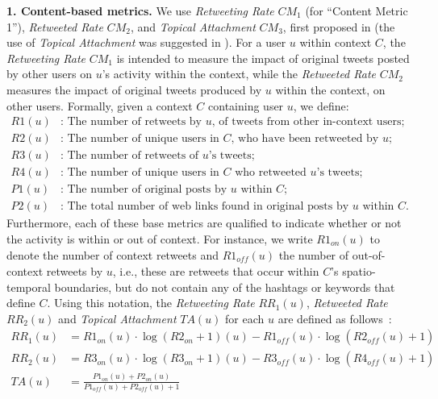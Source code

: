 \documentclass[runningheads]{llncs}
\begin{document}
\noindent \textbf{1. Content-based metrics.}  We use \textit{Retweeting Rate} $\mathit{CM}_1$ (for ``Content Metric 1''), \textit{Retweeted Rate} $\mathit{CM}_2$, and \textit{Topical Attachment} $\mathit{CM}_3$, first proposed in \cite{Bizid:2015} (the use of \textit{Topical Attachment} was suggested in \cite{Poell2014}).
%
For a user $u$ within context $C$, the \textit{Retweeting Rate} $\mathit{CM}_1$ is intended to measure the impact of original tweets posted by other users on $u$'s activity within the context, while the \textit{Retweeted Rate} $\mathit{CM}_2$ measures the impact of original tweets produced by $u$ within the context, on other users.
Formally, given a context $C$ containing user $u$, we define:
%
\begin{align*}
\mathit{R1}(u) &\text{: The number of retweets by $u$, of tweets from other in-context users;}\\
\mathit{R2}(u)&\text{: The number of unique users in $C$, who have been retweeted by $u$;}\\
\mathit{R3}(u)&\text{: The number of retweets of $u$'s tweets;}\\
\mathit{R4}(u)&\text{: The number of unique users in $C$ who retweeted $u$'s tweets;}\\
\mathit{P1}(u)&\text{: The number of original posts by $u$ within $C$;}\\
\mathit{P2}(u)&\text{: The total number of web links found in original posts by $u$ within $C$.}
\end{align*}
%
Furthermore, each of these base metrics are qualified to indicate whether or not the activity is within or out of context.
For instance, we write $R1_{on}(u)$ to denote the number of context retweets and $R1_{\mathit{off}}(u)$ the number of out-of-context retweets by $u$, i.e., these are retweets that occur within $C$'s spatio-temporal boundaries, but do not contain any of the hashtags or keywords that define $C$. 
Using this notation, the \textit{Retweeting Rate} $\mathit{RR}_1(u)$, \textit{Retweeted Rate} $\mathit{RR}_2(u)$ and \textit{Topical Attachment} $TA(u)$ for each $u$ are defined as follows~\cite{Bizid:2015}:
\begin{align*}
\mathit{RR}_1(u) & = \mathit{R1}_{on}(u) \cdot \log(\mathit{R2}_{on}+1)(u) - \mathit{R1}_{\mathit{off}}(u) \cdot \log(\mathit{R2}_{\mathit{off}}(u)+1) \\
\mathit{RR}_2(u) & = \mathit{R3}_{on}(u) \cdot \log(\mathit{R3}_{on}+1)(u) - \mathit{R3}_{\mathit{off}}(u) \cdot \log(\mathit{R4}_{\mathit{off}}(u)+1) \\
\mathit{TA}(u) & = \frac{\mathit{P1}_{on}(u) + \mathit{P2}_{on}(u)}{\mathit{P1}_{\mathit{off}}(u) + \mathit{P2}_{\mathit{off}}(u) +1} 
\end{align*}
\end{document}
